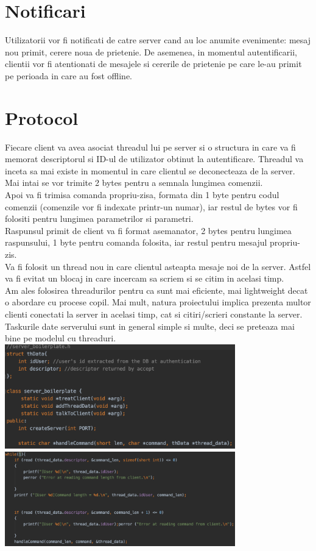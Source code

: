 \documentclass[runningheads]{llncs}
\begin{document}
\section{Notificari}
Utilizatorii vor fi notificati de catre server cand au loc anumite evenimente: mesaj nou primit, cerere noua de prietenie. De asemenea, in momentul autentificarii, clientii vor fi atentionati de mesajele si cererile de prietenie pe care le-au primit pe perioada in care au fost offline.\\
\section{Protocol}
Fiecare client va avea asociat threadul lui pe server si o structura in care va fi memorat descriptorul si ID-ul de utilizator obtinut la autentificare. Threadul va inceta sa mai existe in momentul in care clientul se deconecteaza de la server.\\ 
Mai intai se vor trimite 2 bytes pentru a semnala lungimea comenzii.\\
Apoi va fi trimisa comanda propriu-zisa, formata din 1 byte pentru codul comenzii (comenzile vor fi indexate printr-un numar), iar restul de bytes vor fi folositi pentru lungimea parametrilor si parametri.\\
Raspunsul primit de client va fi format asemanator, 2 bytes pentru lungimea raspunsului, 1 byte pentru comanda folosita, iar restul pentru mesajul propriu-zis.\\
Va fi folosit un thread nou in care clientul asteapta mesaje noi de la server. Astfel va fi evitat un blocaj in care incercam sa scriem si se citim in acelasi timp.\\
Am ales folosirea threadurilor pentru ca sunt mai eficiente, mai lightweight decat o abordare cu procese copil. Mai mult, natura proiectului implica prezenta multor clienti conectati la server in acelasi timp, cat si citiri/scrieri  constante la server. Taskurile date serverului sunt in general simple si multe, deci se preteaza mai bine pe modelul cu threaduri.\\
\includegraphics[width=100mm,scale=1]{retele_pics/boilerplate_header.png}\\
\includegraphics[width=100mm,scale=1]{retele_pics/reading_handling_cmd.png}\\
\end{document}
